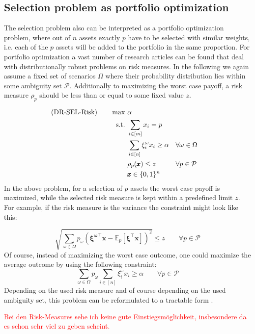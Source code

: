 \documentclass[a4paper,abstracton]{scrartcl}
\begin{document}
\subsection{Selection problem as portfolio optimization}
The selection problem also can be interpreted as a portfolio optimization problem, where out of $n$ assets exactly $p$ have to be selected with similar weights, i.e. each of the $p$ assets will be added to the portfolio in the same proportion. For portfolio optimization a vast number of research articles can be found that deal with distributionally robust problems on risk measures. In the following we again assume a fixed set of scenarios $\Omega$ where their probability distribution lies within some ambiguity set $\mathcal{P}$. Additionally to maximizing the worst case payoff, a risk measure $\rho_p$ should be less than or equal to some fixed value $z$.

\begin{align*}
\textnormal{(DR-SEL-Risk)} \qquad\max \ & \alpha\\
\textnormal{s.t.}\ & \sum_{i \in [m]} x_i =p \\
&\sum_{i \in [n]}\xi^\omega_i x_i \geq \alpha && \forall \omega \in \Omega \\
&\rho_p(\pmb{x})\leq z && \forall p\in \mathcal{P}\\
& \pmb{x} \in \{0,1\}^n
\end{align*}
In the above problem, for a selection of $p$ assets the worst case payoff is maximized, while the selected risk measure is kept within a predefined limit $z$. 
For example, if the risk measure is the variance the constraint might look like this:

$$\sqrt{\sum_{\omega \in \Omega} p_\omega\left(\pmb{\xi^\omega}^\top \pmb{x}-\mathbb{E}_p[\pmb{\xi}^\top \pmb{x}]\right)^2} \leq z \qquad \forall p \in \mathcal{P}$$
Of course, instead of maximizing the worst case outcome, one could maximize the average outcome by using the following constraint:
$$\sum_{\omega \in \Omega}p_\omega\sum_{i \in [n]}\xi^\omega_i x_i \geq \alpha \qquad \forall p \in \mathcal{P}$$
Depending on the used risk measure and of course depending on the used ambiguity set, this problem can be reformulated to a tractable form \cite{postek2014tractable}.

\textcolor{red}{Bei den Risk-Measures sehe ich keine gute Einstiegsmöglichkeit, insbesondere da es schon sehr viel zu geben scheint.}
\end{document}
